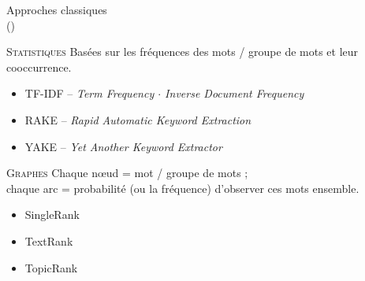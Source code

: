 \begin{frame}{Approches classiques\\ {\small(\hypersetup{citecolor=yellow}\cite{garaudclassiques})}}
\begin{block}{\textsc{Statistiques}}
\justifying
Basées sur les fréquences des mots / groupe de mots et leur cooccurrence.
\end{block}
\begin{itemize}
\small
\item \textsc{TF-IDF} -- \textit{Term Frequency $\cdot$ Inverse Document Frequency} \hfill \citep{sparck1972statistical}
\item \textsc{RAKE} -- \textit{Rapid Automatic Keyword Extraction} \hfill \citep{rose2010automatic}
\item \textsc{YAKE} -- \textit{Yet Another Keyword Extractor} \hfill \citep{CAMPOS2020257}
\end{itemize}

\begin{block}{\textsc{Graphes}}
\justifying
Chaque nœud = mot / groupe de mots ; \\chaque arc = probabilité (ou la fréquence) d’observer ces mots ensemble.
\end{block}
\begin{itemize}
\small
\item SingleRank \hfill \citep{wan2008}
\item TextRank \hfill \citep{mihalcea2004}
\item TopicRank \hfill \citep{bougouin2013topicrank}
\end{itemize}

\end{frame}

